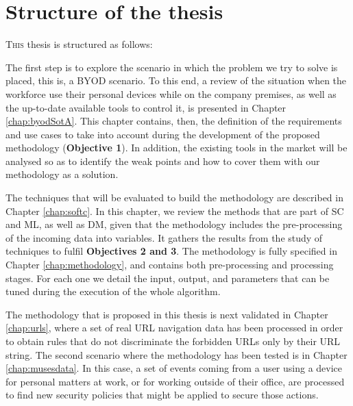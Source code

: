 

\section{Structure of the thesis}
\label{sec:intro:structure}


\lettrine{T}{his} thesis is structured as follows:

The first step is to explore the scenario in which the problem we try to solve is placed, this is, a BYOD scenario. To this end, a review of the situation when the workforce use their personal devices while on the company premises, as well as the up-to-date available tools to control it, is presented in Chapter \ref{chap:byodSotA}. This chapter contains, then, the definition of the requirements and use cases to take into account during the development of the proposed methodology (\textbf{Objective 1}). In addition, the existing tools in the market will be analysed so as to identify the weak points and how to cover them with our methodology as a solution.

The techniques that will be evaluated to build the methodology are described in Chapter \ref{chap:softc}. In this chapter, we review the methods that are part of SC and ML, as well as DM, given that the methodology includes the pre-processing of the incoming data into variables. It gathers the results from the study of techniques to fulfil \textbf{Objectives 2 and 3}. The methodology is fully specified in Chapter \ref{chap:methodology}, and contains both pre-processing and processing stages. For each one we detail the input, output, and parameters that can be tuned during the execution of the whole algorithm.

The methodology that is proposed in this thesis is next validated in Chapter \ref{chap:urls}, where a set of real URL navigation data has been processed in order to obtain rules that do not discriminate the forbidden URLs only by their URL string. The second scenario where the methodology has been tested is in Chapter \ref{chap:musesdata}. In this case, a set of events coming from a user using a device for personal matters at work, or for working outside of their office, are processed to find new security policies that might be applied to secure those actions.

